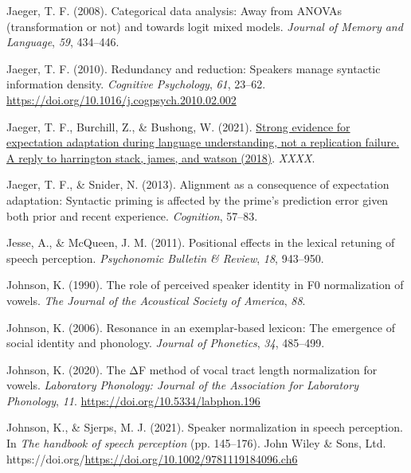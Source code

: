\documentclass[
  11pt,
  man,floatsintext]{apa6}
\newlength{\cslhangindent}
\newlength{\cslentryspacingunit} %
\newenvironment{CSLReferences}[2] %
 {%
  \setlength{\parindent}{0pt}
  \ifodd #1
  \let\oldpar\par
  \def\par{\hangindent=\cslhangindent\oldpar}
  \fi
  \setlength{\parskip}{#2\cslentryspacingunit}
 }%
 {}
\begin{document}
\begin{CSLReferences}{1}{0}
\leavevmode{}%
Jaeger, T. F. (2008). Categorical data analysis: Away from ANOVAs (transformation or not) and towards logit mixed models. \emph{Journal of Memory and Language}, \emph{59}, 434--446.

\leavevmode{}%
Jaeger, T. F. (2010). Redundancy and reduction: Speakers manage syntactic information density. \emph{Cognitive Psychology}, \emph{61}, 23--62. \url{https://doi.org/10.1016/j.cogpsych.2010.02.002}

\leavevmode{}%
Jaeger, T. F., Burchill, Z., \& Bushong, W. (2021). \href{}{Strong evidence for expectation adaptation during language understanding, not a replication failure. A reply to harrington stack, james, and watson (2018)}. \emph{XXXX}.

\leavevmode{}%
Jaeger, T. F., \& Snider, N. (2013). Alignment as a consequence of expectation adaptation: Syntactic priming is affected by the prime's prediction error given both prior and recent experience. \emph{Cognition}, 57--83.

\leavevmode{}%
Jesse, A., \& McQueen, J. M. (2011). Positional effects in the lexical retuning of speech perception. \emph{Psychonomic Bulletin \& Review}, \emph{18}, 943--950.

\leavevmode{}%
Johnson, K. (1990). The role of perceived speaker identity in F0 normalization of vowels. \emph{The Journal of the Acoustical Society of America}, \emph{88}.

\leavevmode{}%
Johnson, K. (2006). Resonance in an exemplar-based lexicon: The emergence of social identity and phonology. \emph{Journal of Phonetics}, \emph{34}, 485--499.

\leavevmode{}%
Johnson, K. (2020). The ΔF method of vocal tract length normalization for vowels. \emph{Laboratory Phonology: Journal of the Association for Laboratory Phonology}, \emph{11}. \url{https://doi.org/10.5334/labphon.196}

\leavevmode{}%
Johnson, K., \& Sjerps, M. J. (2021). Speaker normalization in speech perception. In \emph{The handbook of speech perception} (pp. 145--176). John Wiley \& Sons, Ltd. https://doi.org/\url{https://doi.org/10.1002/9781119184096.ch6}


\end{CSLReferences}
\end{document}
